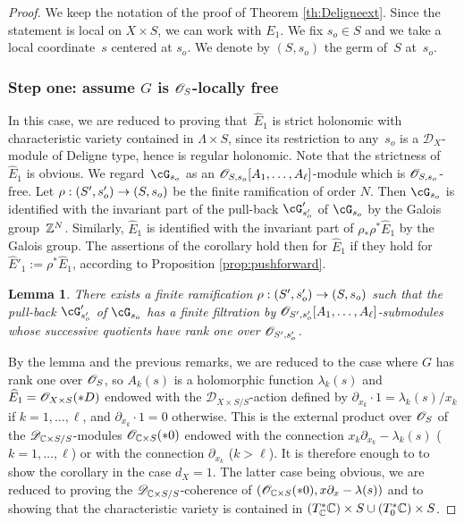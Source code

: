 \documentclass[english]{smfart}
\numberwithin{subsection}{section}
\def\shd{\mathcal{D}}\let\cD\shd
\newcommand{\XS}{X\times S}
\newcommand{\DXS}{\shd_{\XS/S}}
\let\wh\widehat
\numberwithin{equation}{section}
\theoremstyle{plain}
\newtheorem{lemma}[equation]{Lemma}
\theoremstyle{definition}
\def\to{\mathchoice{\longrightarrow}{\rightarrow}{\rightarrow}{\rightarrow}}
\begin{document}
\begin{proof}
We keep the notation of the proof of Theorem \ref{th:Deligneext}. Since the statement is local on $\XS$, we can work with $E_1$. We fix $s_o\in S$ and we take a local coordinate~$s$ centered at $s_o$. We denote by $(S,s_o)$ the germ of~$S$ at~$s_o$.

\subsubsection*{Step one: assume $G$ is $\cO_S$-locally free}
In this case, we are reduced to proving that~$\wh E_1$ is strict holonomic with characteristic variety contained in $\Lambda\times S$, since its restriction to any~$s_o$ is a $\cD_X$-module of Deligne type, hence is regular holonomic. Note that the strictness of $\wh E_1$ is obvious. We regard~$\cG_{s_o}$ as an $\cO_{S,s_o}[A_1,\dots,A_\ell]$-module which is $\cO_{S,s_o}$-free. Let $\rho:(S',s'_o)\to (S,s_o)$ be the finite ramification of order $N$. Then $\cG_{s_o}$ is identified with the invariant part of the pull-back $\cG'_{s'_o}$ of $\cG_{s_o}$ by the Galois group~$\mathbb{Z}^N$. Similarly, $\wh E_1$ is identified with the invariant part of $\rho_*\rho^*\wh E_1$ by the Galois group. The assertions of the corollary hold then for $\wh E_1$ if they hold for $\wh E'_1:=\rho^*\wh E_1$, according to Proposition \ref{prop:pushforward}.

\begin{lemma}
There exists a finite ramification $\rho:(S',s'_o)\to (S,s_o)$ such that the pull-back $\cG'_{s'_o}$ of $\cG_{s_o}$ has a finite filtration by $\cO_{S',s'_o}[A_1,\dots,A_\ell]$-submodules whose successive quotients have rank one over $\cO_{S',s'_o}$.
\end{lemma}

By the lemma and the previous remarks, we are reduced to the case where $G$ has rank one over $\cO_S$, so $A_k(s)$ is a holomorphic function $\lambda_k(s)$ and $\wh E_1=\cO_{\XS}(*D)$ endowed with the $\DXS$-action defined by $\partial_{x_k}\cdot 1=\lambda_k(s)/x_k$ if $k=1,\dots,\ell$, and $\partial_{x_k}\cdot 1=0$ otherwise. This is the external product over $\cO_S$ of the $\cD_{\CC\times S/S}$-modules $\cO_{\CC\times S}(*0)$ endowed with the connection $x_k\partial_{x_k}-\lambda_k(s)$ ($k=1,\dots,\ell$) or with the connection $\partial_{x_k}$ ($k>\ell$). It is therefore enough to to show the corollary in the case $d_X=1$. The latter case being obvious, we are reduced to proving the $\cD_{\CC\times S/S}$-coherence of $(\cO_{\CC\times S}(*0),x\partial_x-\lambda(s))$ and to showing that the characteristic variety is contained in $(T^*_{\mathbb{C}}\mathbb{C})\times S\cup (T^*_0\mathbb{C})\times S$.


\end{proof}
\end{document}
